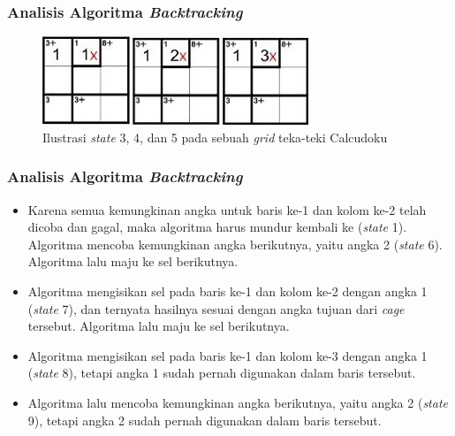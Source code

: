\documentclass{beamer}
\begin{document}
\begin{frame}
\frametitle{Analisis Algoritma \textit{Backtracking}}
\begin{figure}
\centering
\captionsetup{justification=centering}
\includegraphics[scale=1]{Gambar/Backtracking5}
\caption[Ilustrasi \textit{state} 3, 4, dan 5 pada sebuah \textit{grid} teka-teki Calcudoku]{Ilustrasi \textit{state} 3, 4, dan 5 pada sebuah \textit{grid} teka-teki Calcudoku}
\label{fig:backtracking5}
\end{figure}
\end{frame}

\note{

}

\begin{frame}
\frametitle{Analisis Algoritma \textit{Backtracking}}
\begin{itemize}
\item Karena semua kemungkinan angka untuk baris ke-1 dan kolom ke-2 telah dicoba dan gagal, maka algoritma harus mundur kembali ke (\textit{state} 1). Algoritma mencoba kemungkinan angka berikutnya, yaitu angka 2 (\textit{state} 6). Algoritma lalu maju ke sel berikutnya.
\item Algoritma mengisikan sel pada baris ke-1 dan kolom ke-2 dengan angka 1 (\textit{state} 7), dan ternyata hasilnya sesuai dengan angka tujuan dari \textit{cage} tersebut. Algoritma lalu maju ke sel berikutnya.
\item Algoritma mengisikan sel pada baris ke-1 dan kolom ke-3 dengan angka 1 (\textit{state} 8), tetapi angka 1 sudah pernah digunakan dalam baris tersebut.
\item Algoritma lalu mencoba kemungkinan angka berikutnya, yaitu angka 2 (\textit{state} 9), tetapi angka 2 sudah pernah digunakan dalam baris tersebut.
\end{itemize}
\end{frame}
\end{document}
